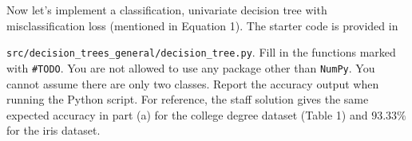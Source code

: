 \item {} 
Now let’s implement a classification, univariate decision tree with misclassification loss (mentioned in Equation 1). The starter code is provided in 

\texttt{src/decision\_trees\_general/decision\_tree.py}. Fill in the functions marked with \texttt{\#TODO}. You are not allowed to use any package other than \texttt{NumPy}. You cannot assume there are only two classes. Report the accuracy output when running the Python script. For reference, the 
staff solution gives the same expected accuracy in part (a) for the college degree dataset (Table 1) 
and $93.33\%$ for the iris dataset.